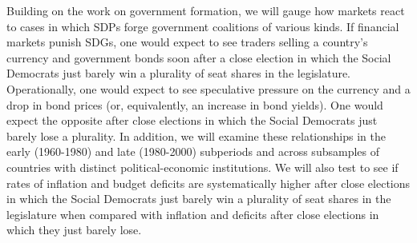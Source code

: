 \documentclass[12pt]{article}
\begin{document}
Building on the work on government formation, we will gauge how markets react to cases in which SDPs forge government coalitions of various kinds. If financial markets punish SDGs, one would expect to see traders selling a country's currency and government bonds soon after a close election in which the Social Democrats just barely win a plurality of seat shares in the legislature. Operationally, one would expect to see speculative pressure \citep{Eichengreen1995} on the currency and a drop in bond prices (or, equivalently, an increase in bond yields). One would expect the opposite after close elections in which the Social Democrats just barely lose a plurality. In addition, we will examine these relationships in the early (1960-1980) and late (1980-2000) subperiods and across subsamples of countries with distinct political-economic institutions. We will also test to see if rates of inflation and budget deficits are systematically higher after close elections in which the Social Democrats just barely win a plurality of seat shares in the legislature when compared with inflation and deficits after close elections in which they just barely lose.   
\end{document}
